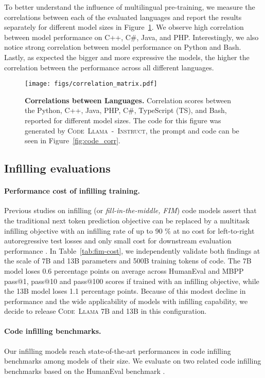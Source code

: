 \documentclass[10pt]{article}
\newcommand{\model}{\textsc{Code~Llama}\xspace}
\newcommand{\instmodel}{\textsc{Code~Llama~-~Instruct}\xspace}
\begin{document}
To better understand the influence of multilingual pre-training, we measure the correlations between each of the evaluated languages and report the results separately for different model sizes in Figure~\ref{fig:correl}. We observe high correlation between model performance on C++, C\#, Java, and PHP. Interestingly, we also notice strong correlation between model performance on Python and Bash. Lastly, as expected the bigger and more expressive the models, the higher the correlation between the performance across all different languages.


\begin{figure}[t!]
     \centering     
     \texttt{[image: figs/correlation\_matrix.pdf]}
    \caption{\textbf{Correlations between Languages.} Correlation scores between the Python, C++, Java, PHP, C\#, TypeScript (TS), and Bash, reported for different model sizes. The code for this figure was generated by \instmodel, the prompt and code can be seen in Figure~\ref{fig:code_corr}.}
    \label{fig:correl}
\end{figure}

\subsection{Infilling evaluations}\label{sec:infilling_evals}
\label{sec:fim_results}
\paragraph{Performance cost of infilling training.}
Previous studies on infilling (or \emph{fill-in-the-middle, FIM}) code models assert that the traditional next token prediction objective can be replaced by a multitask infilling objective with an infilling rate of up to 90 \% at no cost for left-to-right autoregressive test losses \citep{bavarian2022efficient} and only small cost for downstream evaluation performance \citep{allal2023santacoder}. In Table~\ref{tab:fim-cost}, we independently validate both findings at the scale of 7B and 13B parameters and 500B training tokens of code. The 7B model loses 0.6 percentage points on average across HumanEval and MBPP pass@1, pass@10 and pass@100 scores if trained with an infilling objective, while the 13B model loses 1.1 percentage points. Because of this modest decline in performance and the wide applicability of models with infilling capability, we decide to release \model 7B and 13B in this configuration.

\paragraph{Code infilling benchmarks.}
Our infilling models reach state-of-the-art performances in code infilling benchmarks among models of their size. We evaluate on two related code infilling benchmarks based on the HumanEval benchmark \citep{chen2021evaluating}.
\end{document}
